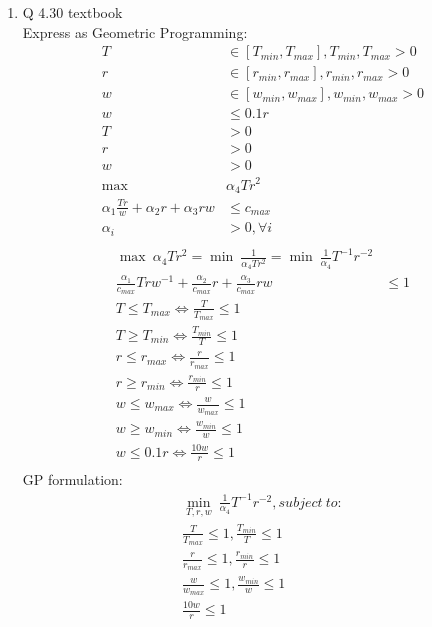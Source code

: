 \documentclass[12pt,letter]{article}
\begin{document}
\begin{enumerate}
\item Q 4.30 textbook\\
  Express as Geometric Programming:\\
  \begin{align*}
    T & \in [T_{min}, T_{max}], T_{min},T_{max} > 0 \\
    r & \in [r_{min}, r_{max}], r_{min},r_{max} > 0\\
    w & \in [w_{min}, w_{max}], w_{min},w_{max} > 0\\
    w & \leq 0.1 r\\
    T &> 0 \\
    r &> 0 \\
    w &> 0\\
    \max\ &\alpha_4 T r^2\\
    \alpha_1 \frac{T r}{w} + \alpha_2 r + \alpha_3 r w & \leq c_{max}\\
    \alpha_i &> 0, \forall i\\
  \end{align*}
  \begin{align*}
    \max\ \alpha_4 T r^2=\min\ \frac{1}{\alpha_4 T r^2} = \min\ \frac{1}{\alpha_4} T^{-1} r^{-2}\\
    \frac{\alpha_1}{c_{max}} T rw^{-1} + \frac{\alpha_2}{c_{max}} r + \frac{\alpha_3}{c_{max}} r w & \leq 1\\
    T \leq T_{max} \iff \frac{T}{T_{max}} \leq 1\\
    T \geq T_{min} \iff \frac{T_{min}}{T} \leq 1\\
    r \leq r_{max} \iff \frac{r}{r_{max}} \leq 1\\
    r \geq r_{min} \iff \frac{r_{min}}{r} \leq 1\\
    w \leq w_{max} \iff \frac{w}{w_{max}} \leq 1\\
    w \geq w_{min} \iff \frac{w_{min}}{w} \leq 1\\
    w \leq 0.1 r \iff \frac{10w}{r} \leq 1 \\    
  \end{align*}
  GP formulation:
  \begin{align*}
    \min_{T,r,w}\ \frac{1}{\alpha_4} T^{-1} r^{-2}, subject\ to:\\
    \frac{T}{T_{max}} \leq 1, \frac{T_{min}}{T} \leq 1\\
    \frac{r}{r_{max}} \leq 1, \frac{r_{min}}{r} \leq 1\\
    \frac{w}{w_{max}} \leq 1, \frac{w_{min}}{w} \leq 1\\
    \frac{10w}{r} \leq 1 \\

\end{align*}
\end{enumerate}
\end{document}

